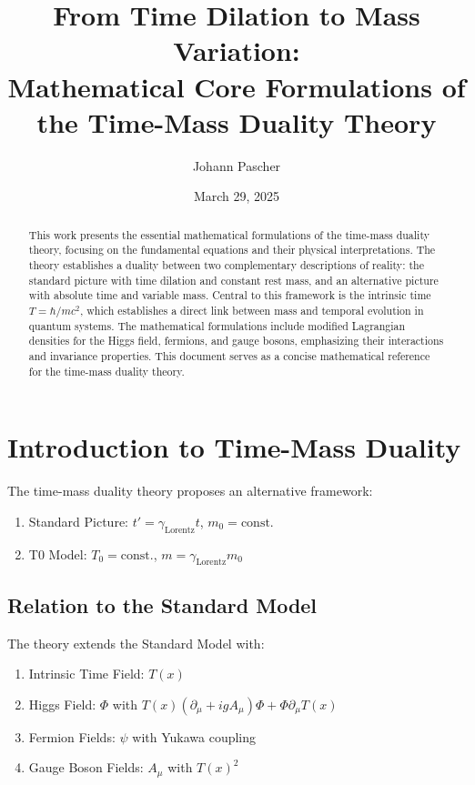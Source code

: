 \documentclass{article}
\title{From Time Dilation to Mass Variation: \\ Mathematical Core Formulations of the Time-Mass Duality Theory}
\author{Johann Pascher}
\date{March 29, 2025}
\newcommand{\Tfield}{T(x)}
\newcommand{\DhiggsT}{\Tfield (\partial_\mu + igA_\mu)\Phi + \Phi \partial_\mu \Tfield}
\newcommand{\gammaf}{\gamma_{\text{Lorentz}}}
\theoremstyle{definition}
\theoremstyle{remark}
\begin{document}
	
	\maketitle
	
	\begin{abstract}
		This work presents the essential mathematical formulations of the time-mass duality theory, focusing on the fundamental equations and their physical interpretations. The theory establishes a duality between two complementary descriptions of reality: the standard picture with time dilation and constant rest mass, and an alternative picture with absolute time and variable mass. Central to this framework is the intrinsic time \( T = \hbar/mc^2 \), which establishes a direct link between mass and temporal evolution in quantum systems. The mathematical formulations include modified Lagrangian densities for the Higgs field, fermions, and gauge bosons, emphasizing their interactions and invariance properties. This document serves as a concise mathematical reference for the time-mass duality theory.
	\end{abstract}
	
	\tableofcontents
	\newpage
	
	\section{Introduction to Time-Mass Duality}
	The time-mass duality theory proposes an alternative framework:
	\begin{enumerate}
		\item Standard Picture: \( t' = \gammaf t \), \( m_0 = \text{const.} \)
		\item T0 Model: \( T_0 = \text{const.} \), \( m = \gammaf m_0 \)
	\end{enumerate}
	
	\subsection{Relation to the Standard Model}
	The theory extends the Standard Model with:
	\begin{enumerate}
		\item Intrinsic Time Field: \( \Tfield \)
		\item Higgs Field: \( \Phi \) with \( \DhiggsT \)
		\item Fermion Fields: \( \psi \) with Yukawa coupling
		\item Gauge Boson Fields: \( A_\mu \) with \( \Tfield^2 \)
	\end{enumerate}
	
\end{document}

